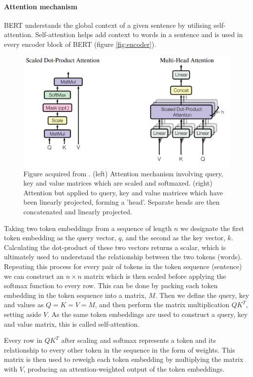 \documentclass{article}
\begin{document}
\paragraph{Attention mechanism}
BERT understands the global context of a given sentence by utilising self-attention. Self-attention helps add context to words in a sentence and is used in every encoder block of BERT (figure \ref{fig:encoder}). 

\begin{figure}[H]
    \centering
    \includegraphics[width=0.8\linewidth]{images/attention.png}
    \caption{Figure acquired from \cite{vaswani2017attention}. (left) Attention mechanism involving query, key and value matrices which are scaled and softmaxed. (right) Attention but applied to query, key and value matrices which have been linearly projected, forming a 'head'. Separate heads are then concatenated and linearly projected.}
    \label{fig:attention}
\end{figure}

Taking two token embeddings from a sequence of length $n$ we designate the first token embedding as the query vector, $q$, and the second as the key vector, $k$. Calculating the dot-product of these two vectors returns a scalar, which is ultimately used to understand the relationship between the two tokens (words). Repeating this process for every pair of tokens in the token sequence (sentence) we can construct an $n\times n$ matrix which is then scaled before applying the softmax function to every row. This can be done by packing each token embedding in the token sequence into a matrix, $M$. Then we define the query, key and values as $Q=K=V=M$, and then perform the matrix multiplication $QK^T$, setting aside $V$. As the same token embeddings are used to construct a query, key and value matrix, this is called self-attention. 

Every row in $QK^T$ after scaling and softmax represents a token and its relationship to every other token in the sequence in the form of weights. This matrix is then used to reweigh each token embedding by multiplying the matrix with $V$, producing an attention-weighted output of the token embeddings.
\end{document}
